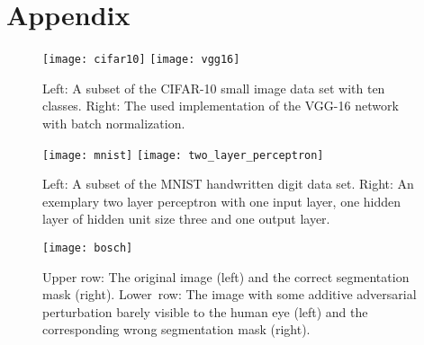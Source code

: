 \newpage
\section{Appendix}
\begin{figure}[h!]
	\centering
	\texttt{[image: cifar10]}
	\texttt{[image: vgg16]}
	\caption{Left: A subset of the CIFAR-10 small image data set with ten classes. Right: The used implementation of the VGG-16 network with batch normalization. \cite{cifar10, vgg16}}	
	\label{fig:cifar-vgg}
\end{figure}

\begin{figure}[h!]
	\centering
	\texttt{[image: mnist]}
	\texttt{[image: two\_layer\_perceptron]}
	\caption{Left: A subset of the MNIST handwritten digit data set. Right: An exemplary two layer perceptron with one input layer, one hidden layer of hidden unit size three and one output layer. \cite{mnist, two-layer-perceptron}}	
	\label{fig:mnist-two-layer}
\end{figure}

\begin{figure}[h!]
	\centering
	\texttt{[image: bosch]}
	\caption{Upper row: The original image (left) and the correct segmentation mask (right). Lower~row: The image with some additive adversarial perturbation barely visible to the human eye (left) and the corresponding wrong segmentation mask (right). \cite{metzen2017universal}}	
	\label{fig:adversarial-perturbations}
\end{figure}